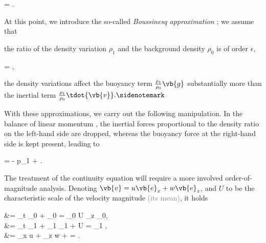 \documentclass[../main.tex]{subfiles}
\begin{document}
\begin{equations}[single,*]
 = \epsilon {}.
\end{equations}

At this point, we introduce the so-called \emph{Boussinesq approximation} \autocite[p.~4]{spiegelBoussinesqApproximationCompressible1960} \autocite[p.~26]{nappoIntroductionAtmosphericGravity2013}; we assume that

\begin{compactenum}
\item the ratio of the density variation $\rho_1$ and the background density $\rho_0$ is of order $\epsilon$, \begin{equations}[single,*]
		 = \bigO{\epsilon},
	\end{equations}
\item the density variations affect the buoyancy term $\frac{\rho_1}{\rho_0} \vb{g}$ substantially more than the inertial term $\frac{\rho_1}{\rho_{0}}\tdot{\vb{v}}.\sidenotemark$
\end{compactenum}

With these approximations, we carry out the following manipulation. In the balance of linear momentum , the inertial forces proportional to the density ratio on the left-hand side are dropped, whereas the buoyancy force at the right-hand side is kept present, leading to

\begin{equations}[single,*]
	 = -  \grad p_1 +  .
\end{equations}

The treatment of the continuity equation will require a more involved order-of-magnitude analysis. Denoting $\vb{v} = u \vb{e}_x + w \vb{e}_z$, and $U$ to be the characteristic scale of the velocity magnitude \textcolor{gray}{(\eg its mean)}, it holds

\begin{equations}[columns,*]
	 &= \partial_t \rho_0 +  \cdot \grad \rho_0 =  \cdot \grad \rho_0 \propto U \partial_{z} \rho_0, \\ 
	 &= \partial_t \rho_1 +  \cdot \grad \rho_1 \propto {}\rho_1 + U  = \rho_1 ,\\
	\div {} &= \partial_{x} u + \partial_{z} w \propto {} +  = .
\end{equations}
\end{document}
